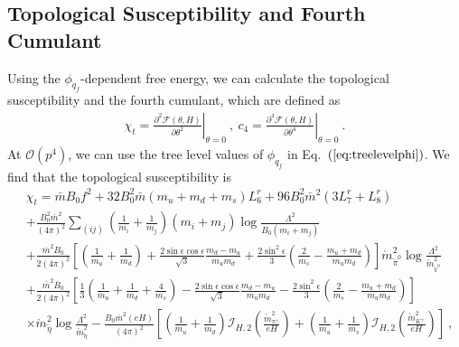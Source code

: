 \documentclass[12pt]{elsarticle}
\begin{document}
\subsection{Topological Susceptibility and Fourth Cumulant}
\label{sec:top}
\noindent
Using the $\phi_{q_{f}}$-dependent free energy, we can calculate the topological susceptibility and the fourth cumulant, which are defined as
\begin{equation}
\begin{split}
\label{eq:chitc40}
\chi_{t}=\left.\frac{\partial^{2}\mathcal{F}(\theta,H)}{\partial \theta^{2}}\right|_{\theta=0}\ ,\ c_{4}=\left.\frac{\partial^{4}\mathcal{F}(\theta,H)}{\partial \theta^{4}}\right|_{\theta=0}\ .
\end{split}
\end{equation}
At $\mathcal{O}(p^{4})$, we can use the tree level values of $\phi_{q_{f}}$ in Eq.~$(\ref{eq:treelevelphi})$. We find that the topological susceptibility is
\begin{equation}
\begin{split}
\label{eq:chit}
&\chi_{t}=\bar{m}B_{0}f^{2}+32B_{0}^{2}\bar{m}(m_{u}+m_{d}+m_{s})L_{6}^{r}+96B_{0}^{2}\bar{m}^{2}(3L^{r}_{7}+L^{r}_{8})\\
&+\frac{B_{0}^{2}\bar{m}^{2}}{(4\pi)^{2}}\sum_{(ij)}\left(\frac{1}{m_{i}}+\frac{1}{m_{j}}\right)(m_{i}+m_{j})\log\frac{\Lambda^{2}}{B_{0}(m_{i}+m_{j})}\\
&+\frac{\bar{m}^{2}B_{0}}{2(4\pi)^{2}}\left[\left(\frac{1}{m_{u}}+\frac{1}{m_{d}}\right)+\frac{2\sin\epsilon\cos\epsilon}{\sqrt{3}}\frac{m_{d}-m_{u}}{m_{u}m_{d}}+\frac{2\sin^{2}\epsilon}{3}\left(\frac{2}{m_{s}}-\frac{m_{u}+m_{d}}{m_{u}m_{d}}\right)\right]\mathring{m}_{\tilde{\pi}^{0}}^{2}\log\frac{\Lambda^{2}}{\mathring{m}_{\tilde{\pi}^{0}}^{2}}\\
&+\frac{\bar{m}^{2}B_{0}}{2(4\pi)^{2}}\left[\frac{1}{3}\left(\frac{1}{m_{u}}+\frac{1}{m_{d}}+\frac{4}{m_{s}}\right)-\frac{2\sin\epsilon\cos\epsilon}{\sqrt{3}}\frac{m_{d}-m_{u}}{m_{u}m_{d}}-\frac{2\sin^{2}\epsilon}{3}\left(\frac{2}{m_{s}}-\frac{m_{u}+m_{d}}{m_{u}m_{d}}\right)\right]\\
&\times\mathring{m}_{\tilde{\eta}}^{2}\log\frac{\Lambda^{2}}{\mathring{m}_{\tilde{\eta}}^{2}}-\frac{B_{0}\bar{m}^{2}(eH)}{(4\pi)^{2}} \left[\left(\frac{1}{m_{u}}+\frac{1}{m_{d}}\right) \mathcal{I}_{H,2}(\tfrac{\mathring{m}_{\pi^{\pm}}^{2}}{eH})+\left(\frac{1}{m_{u}}+\frac{1}{m_{s}}\right)\mathcal{I}_{H,2}(\tfrac{\mathring{m}_{K^{\pm}}^{2}}{eH})\right]\ ,
\end{split}
\end{equation}
\end{document}
